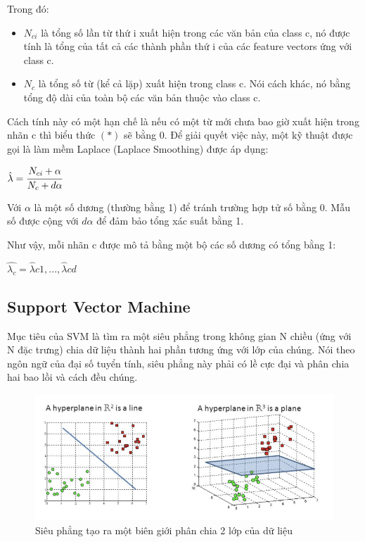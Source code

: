 \documentclass[12pt,a4paper,oneside]{book}
\begin{document}
			Trong đó:
			
			\begin{itemize}
				\item $N_{ci}$ là tổng số lần từ thứ i xuất hiện trong các văn bản của class c, nó được tính là tổng của tất cả các thành phần thứ i của các feature vectors ứng với class c.
				\item $N_c$ là tổng số từ (kể cả lặp) xuất hiện trong class c. Nói cách khác, nó bằng tổng độ dài của toàn bộ các văn bản thuộc vào class c.
			\end{itemize}
			
			Cách tính này có một hạn chế là nếu có một từ mới chưa bao giờ xuất hiện trong nhãn c thì biểu thức $(*)$ sẽ bằng 0. Để giải quyết việc này, một kỹ thuật được gọi là làm mềm Laplace (Laplace Smoothing) được áp dụng:
			
			\begin{center}
				$\hat{\lambda}=\cfrac{N_{ci}+\alpha}{N_c+d\alpha}$
			\end{center}
			
			Với $\alpha$ là một số dương (thường bằng 1) để tránh trường hợp tử số bằng 0. Mẫu số được cộng với $d\alpha$ để đảm bảo tổng xác suất bằng 1.
			
			Như vậy, mỗi nhãn c được mô tả bằng một bộ các số dương có tổng bằng 1:
			
			\begin{center}
				$\hat{\lambda_c}=\hat{\lambda}c1,..., \hat{\lambda}cd$
			\end{center}

		\subsection{Support Vector Machine}
		Mục tiêu của SVM là tìm ra một siêu phẳng trong không gian N chiều (ứng với N đặc trưng) chia dữ liệu thành hai phần tương ứng với lớp của chúng. Nói theo ngôn ngữ của đại số tuyển tính, siêu phẳng này phải có lề cực đại và phân chia hai bao lồi và cách đều chúng.
		
			\begin{figure}[H]
			\begin{center}
		\includegraphics[width=0.68\columnwidth]{SVM_hyperplane}
			\end{center}
		\caption{Siêu phẳng tạo ra một biên giới phân chia 2 lớp của dữ liệu}
			\end{figure}		
		
\end{document}
